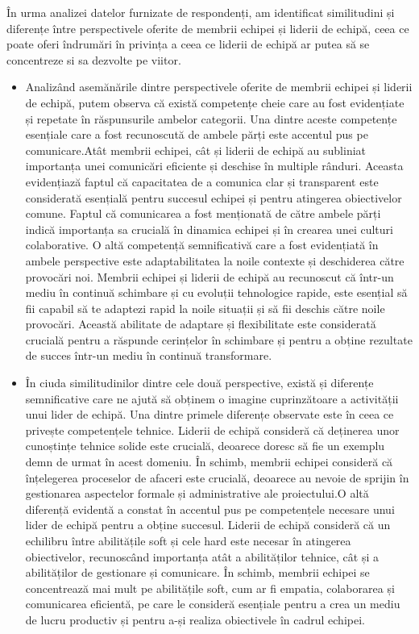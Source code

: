 \documentclass[a4paper, 12pt]{article}
\begin{document}
\begin{enumerate}[A)]
\begin{enumerate}[(1)]
	\quad În urma analizei datelor furnizate de respondenți, am identificat similitudini și diferențe între perspectivele oferite de membrii echipei și liderii de echipă, ceea ce poate oferi îndrumări în privința a ceea ce liderii de echipă ar putea să se concentreze si sa dezvolte pe viitor.

\begin{itemize}

	\item Analizând asemănările dintre perspectivele oferite de membrii echipei și liderii de echipă, putem observa că există competențe cheie care au fost evidențiate și repetate în răspunsurile ambelor categorii. Una dintre aceste competențe esențiale care a fost recunoscută de ambele părți este accentul pus pe comunicare.Atât membrii echipei, cât și liderii de echipă au subliniat importanța unei comunicări eficiente și deschise în multiple rânduri. Aceasta evidențiază faptul că capacitatea de a comunica clar și transparent este considerată esențială pentru succesul echipei și pentru atingerea obiectivelor comune. Faptul că comunicarea a fost menționată de către ambele părți indică importanța sa crucială în dinamica echipei și în crearea unei culturi colaborative. O altă competență semnificativă care a fost evidențiată în ambele perspective este adaptabilitatea la noile contexte și deschiderea către provocări noi. Membrii echipei și liderii de echipă au recunoscut că într-un mediu în continuă schimbare și cu evoluții tehnologice rapide, este esențial să fii capabil să te adaptezi rapid la noile situații și să fii deschis către noile provocări. Această abilitate de adaptare și flexibilitate este considerată crucială pentru a răspunde cerințelor în schimbare și pentru a obține rezultate de succes într-un mediu în continuă transformare.

	\item  În ciuda similitudinilor dintre cele două perspective, există și diferențe semnificative care ne ajută să obținem o imagine cuprinzătoare a activității unui lider de echipă. Una dintre primele diferențe observate este în ceea ce privește competențele tehnice. Liderii de echipă consideră că deținerea unor cunoștințe tehnice solide este crucială, deoarece doresc să fie un exemplu demn de urmat în acest domeniu. În schimb, membrii echipei consideră că înțelegerea proceselor de afaceri este crucială, deoarece au nevoie de sprijin în gestionarea aspectelor formale și administrative ale proiectului.O altă diferență evidentă a constat în accentul pus pe competențele necesare unui lider de echipă pentru a obține succesul. Liderii de echipă consideră că un echilibru între abilitățile soft și cele hard este necesar în atingerea obiectivelor, recunoscând importanța atât a abilităților tehnice, cât și a abilităților de gestionare și comunicare. În schimb, membrii echipei se concentrează mai mult pe abilitățile soft, cum ar fi empatia, colaborarea și comunicarea eficientă, pe care le consideră esențiale pentru a crea un mediu de lucru productiv și pentru a-și realiza obiectivele în cadrul echipei.


\end{itemize}
\end{enumerate}
\end{enumerate}
\end{document}
